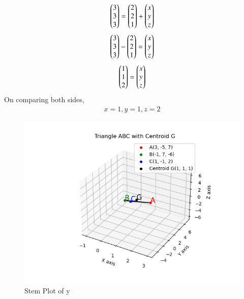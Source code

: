 \documentclass[journal]{IEEEtran}
\begin{document}
\begin{align}
\begin{pmatrix}3\\3\\3\end{pmatrix}=\begin{pmatrix}2\\2\\1\end{pmatrix}+\begin{pmatrix}x\\y\\z\end{pmatrix}\\
\end{align}
\begin{align}
\begin{pmatrix}3\\3\\3\end{pmatrix}-\begin{pmatrix}2\\2\\1\end{pmatrix}=\begin{pmatrix}x\\y\\z\end{pmatrix}\\
\end{align}
\begin{align}
\begin{pmatrix}1\\1\\2\end{pmatrix}=\begin{pmatrix}x\\y\\z\end{pmatrix}\\
\end{align}
On comparing both sides, 
\begin{align}
x=1, y=1, z=2
\end{align}
\begin{figure}[h!]
   \centering
   \includegraphics[width=0.7\linewidth]{Figure_1.png}
   \caption{Stem Plot of y}
   \label{stemplot}
\end{figure}
\end{document}
